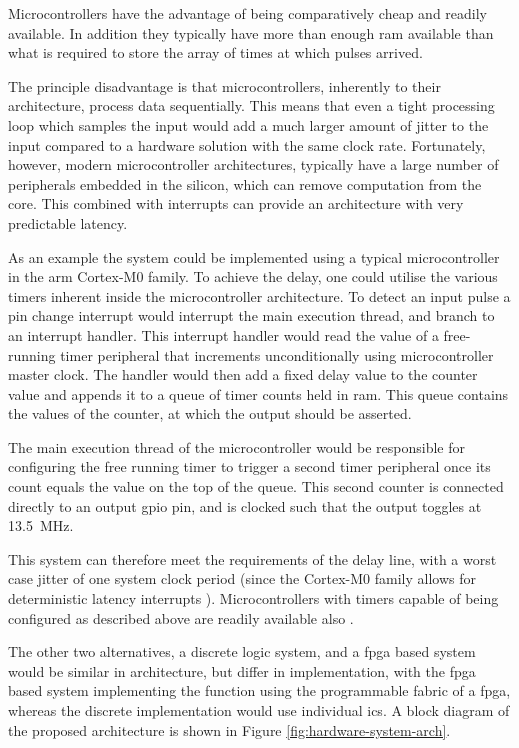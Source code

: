 Microcontrollers have the advantage of being comparatively cheap and readily available. In addition they typically have more than enough \gls{ram} available than what is required to store the array of times at which pulses arrived.

The principle disadvantage is that microcontrollers, inherently to their architecture, process data sequentially. This means that even a tight processing loop which samples the input would add a much larger amount of jitter to the input compared to a hardware solution with the same clock rate. Fortunately, however, modern microcontroller architectures, typically have a large number of peripherals embedded in the silicon, which can remove computation from the core. This combined with interrupts can provide an architecture with very predictable latency.

As an example the system could be implemented using a typical microcontroller in the \gls{arm} Cortex-M0 family. To achieve the delay, one could utilise the various timers inherent inside the microcontroller architecture. To detect an input pulse a pin change interrupt would interrupt the main execution thread, and branch to an interrupt handler. This interrupt handler would read the value of a free-running timer peripheral that increments unconditionally using microcontroller master clock. The handler would then add a fixed delay value to the counter value and appends it to a queue of timer counts held in \gls{ram}. This queue contains the values of the counter, at which the output should be asserted.

The main execution thread of the microcontroller would be responsible for configuring the free running timer to trigger a second timer peripheral once its count equals the value on the top of the queue. This second counter is connected directly to an output \gls{gpio} pin, and is clocked such that the output toggles at \SI{13.5}{\mega\hertz}.

This system can therefore meet the requirements of the delay line, with a worst case jitter of one system clock period (since the Cortex-M0 family allows for deterministic latency interrupts \cite{yiu2016}). Microcontrollers with timers capable of being configured as described above are readily available also \cite{freescale2014}.

The other two alternatives, a discrete logic system, and a \gls{fpga} based system would be similar in architecture, but differ in implementation, with the \gls{fpga} based system implementing the function using the programmable fabric of a \gls{fpga}, whereas the discrete implementation would use individual \glspl{ic}. A block diagram of the proposed architecture is shown in Figure \ref{fig:hardware-system-arch}.

